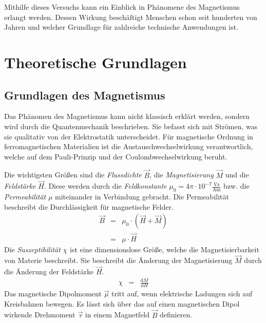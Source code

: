 \documentclass[12pt,a4paper]{scrartcl}
\numberwithin{equation}{section} %
\newcommand{\pu}[1]{\ensuremath{\mathrm{#1}}}
\renewcommand{\[}{} %
\renewcommand{\]}{\noindent} %
\begin{document}
Mithilfe dieses Versuchs kann ein Einblick in Phänomene des Magnetismus erlangt werden. Dessen Wirkung beschäftigt Menschen schon seit hunderten von Jahren und welcher Grundlage für zahlreiche technische Anwendungen ist.

\hypertarget{theoretische-grundlagen}{%
\section{Theoretische Grundlagen}\label{theoretische-grundlagen}}

\hypertarget{grundlagen-des-magnetismus}{%
\subsection{Grundlagen des Magnetismus}\label{grundlagen-des-magnetismus}}

Das Phänomen des Magnetismus kann nicht klassisch erklärt werden, sondern wird durch die Quantenmechanik beschrieben. Sie befasst sich mit Strömen, was sie qualitativ von der Elektrostatik unterscheidet. Für magnetische Ordnung in ferromagnetischen Materialien ist die
Austauschwechselwirkung verantwortlich, welche auf dem Pauli-Prinzip und der Coulombwechselwirkung beruht.

Die wichtigsten Größen sind die \emph{Flussdichte} \(\vec B\), die \emph{Magnetisierung} \(\vec M\) und die \emph{Feldstärke} \(\vec H\). Diese werden durch die \emph{Feldkonstante}
\(\mu_0=4\pi\cdot\pu{10^{-7}\frac{Vs}{Am}}\) bzw. die \emph{Permeabilität} \(\mu\) miteinander in Verbindung gebracht. Die Permeabilität beschreibt die Durchlässigkeit für magnetische Felder. \cite{Jackson}
\begin{eqnarray}
    \vec B
        &=& \mu_0 \cdot \left(\vec H + \vec M\right) \label{M1} \\
        &=& \mu \cdot \vec H
\end{eqnarray}
Die \emph{Suszeptibilität} \(\chi\) ist eine dimensionslose Größe, welche die Magnetisierbarkeit von Materie beschreibt. Sie beschreibt die Änderung der Magnetisierung \(\vec M\) durch die Änderung der Feldstärke \(\vec H\).
\begin{eqnarray}
    \chi &=& \frac{\mathrm dM}{\mathrm dH} \label{Chi}
\end{eqnarray}
Das magnetische Dipolmoment \(\vec \mu\) tritt auf, wenn elektrische Ladungen sich auf Kreisbahnen bewegen. Es lässt sich über das auf einen magnetischen Dipol wirkende Drehmoment \(\vec \tau\) in einem Magnetfeld \(\vec B\) definieren.
\end{document}
